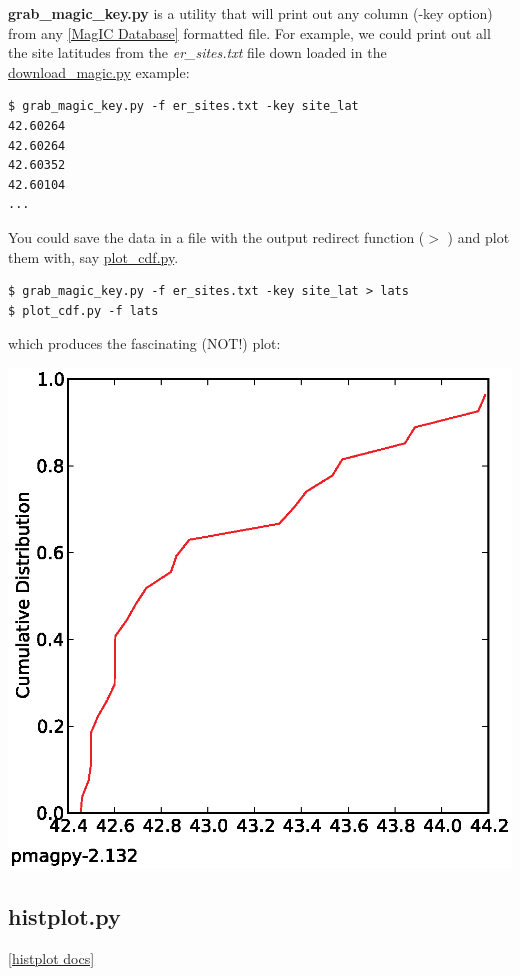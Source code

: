 \documentclass[11pt]{book}
\begin{document}
{{{\bf grab\_magic\_key.py} is  a utility that will print out any column (-key option) from any \href{#MagICDatabase}{[MagIC Database]} formatted file.  For example, we could print out all the site latitudes from the  {\it er\_sites.txt} file down loaded in the \href{#download_magic.py}{download\_magic.py} example:

\begin{verbatim}
$ grab_magic_key.py -f er_sites.txt -key site_lat
42.60264
42.60264
42.60352
42.60104
...
\end{verbatim}

You could save the data in a file with the output redirect function ($>$ ) and plot them with, say \href{#plot_cdf.py}{plot\_cdf.py}.

\begin{verbatim}
$ grab_magic_key.py -f er_sites.txt -key site_lat > lats
$ plot_cdf.py -f lats
\end{verbatim}

which produces  the fascinating (NOT!) plot:

\includegraphics[width=15cm]{EPSfiles/grab_magic_key.eps}


\subsection{histplot.py}
\href{https://github.com/PmagPy/PmagPy/blob/master/programs/histplot.py}{[histplot docs]}

}}
\end{document}
